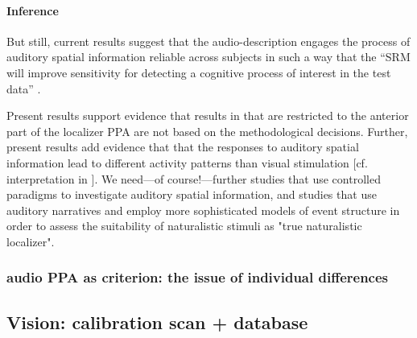\paragraph{Inference}

%
But still, current results suggest that the audio-description engages the
process of auditory spatial information reliable across subjects in such a way
that the ``SRM will improve sensitivity for detecting a cognitive process of
interest in the test data'' \citep{cohen2017computational}.


%
Present results support evidence that results in \citet{haeusler2022processing}
that are restricted to the anterior part of the localizer PPA are not based on
the methodological decisions.
%
Further, present results add evidence that that the responses to auditory
spatial information lead to different activity patterns than visual stimulation
[cf. interpretation in \citet{haeusler2022processing}].
%
We need---of course!---further studies that use controlled paradigms to
investigate auditory spatial information, and studies that use auditory
narratives and employ more sophisticated models of event structure in order to
assess the suitability of naturalistic stimuli as "true naturalistic localizer".



\subsubsection{audio PPA as criterion: the issue of individual differences}




\subsection{Vision: calibration scan + database}




